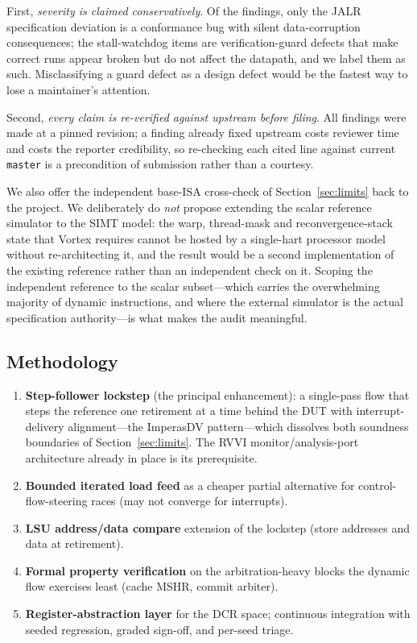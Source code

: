\documentclass[conference]{IEEEtran}
\begin{document}
First, \emph{severity is claimed conservatively}. Of the findings,
only the JALR specification deviation is a conformance bug with silent
data-corruption consequences; the stall-watchdog items are
verification-guard defects that make correct runs appear broken but do
not affect the datapath, and we label them as such. Misclassifying a
guard defect as a design defect would be the fastest way to lose a
maintainer's attention.

Second, \emph{every claim is re-verified against upstream before
filing}. All findings were made at a pinned revision; a finding already
fixed upstream costs reviewer time and costs the reporter credibility,
so re-checking each cited line against current \texttt{master} is a
precondition of submission rather than a courtesy.

We also offer the independent base-ISA cross-check of
Section~\ref{sec:limits} back to the project. We deliberately do
\emph{not} propose extending the scalar reference simulator to the SIMT
model: the warp, thread-mask and reconvergence-stack state that Vortex
requires cannot be hosted by a single-hart processor model without
re-architecting it, and the result would be a second implementation of
the existing reference rather than an independent check on it. Scoping
the independent reference to the scalar subset---which carries the
overwhelming majority of dynamic instructions, and where the external
simulator is the actual specification authority---is what makes the
audit meaningful.

\subsection{Methodology}
\begin{enumerate}
\item \textbf{Step-follower lockstep} (the principal enhancement): a
single-pass flow that steps the reference one retirement at a time
behind the DUT with interrupt-delivery alignment---the ImperasDV
pattern---which dissolves both soundness boundaries of
Section~\ref{sec:limits}. The RVVI monitor/analysis-port architecture
already in place is its prerequisite.
\item \textbf{Bounded iterated load feed} as a cheaper partial
alternative for control-flow-steering races (may not converge for
interrupts).
\item \textbf{LSU address/data compare} extension of the lockstep
(store addresses and data at retirement).
\item \textbf{Formal property verification} on the arbitration-heavy
blocks the dynamic flow exercises least (cache MSHR, commit arbiter).
\item \textbf{Register-abstraction layer} for the DCR space; continuous
integration with seeded regression, graded sign-off, and per-seed
triage.
\end{enumerate}
\end{document}
